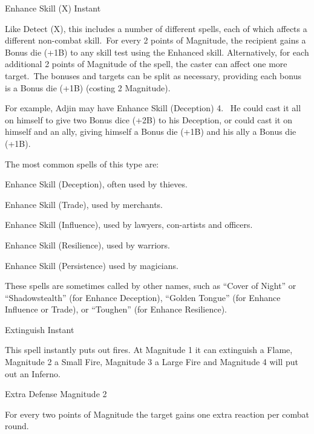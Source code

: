 \begin{rpg-spell}
{Enhance Skill (X)}
{Instant}

Like Detect (X), this includes a number of different spells, each of which affects a different non-combat skill. For every 2 points of Magnitude, the recipient gains a Bonus die (+1B) to any skill test using the Enhanced skill.  Alternatively, for each additional 2 points of Magnitude of the spell, the caster can affect one more target. The bonuses and targets can be split as necessary, providing each bonus is a Bonus die (+1B) (costing 2 Magnitude).

For example, Adjin may have Enhance Skill (Deception) 4.  He could cast it all on himself to give two Bonus dice (+2B) to his Deception, or could cast it on himself and an ally, giving himself a Bonus die (+1B) and his ally a Bonus die (+1B).

The most common spells of this type are:
\begin{rpg-list}
\item Enhance Skill (Deception), often used by thieves.
\item Enhance Skill (Trade), used by merchants.
\item Enhance Skill (Influence), used by lawyers, con-artists and officers.
\item Enhance Skill (Resilience), used by warriors.
\item Enhance Skill (Persistence) used by magicians.
\end{rpg-list}

These spells are sometimes called by other names, such as “Cover of Night” or “Shadowstealth” (for Enhance Deception), “Golden Tongue” (for Enhance Influence or Trade), or “Toughen” (for Enhance Resilience).
\end{rpg-spell}


\begin{rpg-spell}
{Extinguish}
{Instant}

This spell instantly puts out fires. At Magnitude 1 it can extinguish a Flame, Magnitude 2 a Small Fire, Magnitude 3 a Large Fire and Magnitude 4 will put out an Inferno.
\end{rpg-spell}


\begin{rpg-spell}
{Extra Defense}
{Magnitude 2}

For every two points of Magnitude the target gains one extra reaction per combat round.
\end{rpg-spell}


